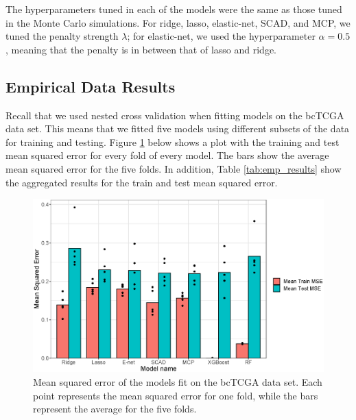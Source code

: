 \documentclass{article}
\begin{document}
	The hyperparameters tuned in each of the models were the same as those tuned in the Monte Carlo simulations. For ridge, lasso, elastic-net, SCAD, and MCP, we tuned the penalty strength $\lambda$; for elastic-net, we used the hyperparameter $\alpha = 0.5$, meaning that the penalty is in between that of lasso and ridge. 
	
	\subsection{Empirical Data Results}
	Recall that we used nested cross validation when fitting models on the bcTCGA data set. This means that we fitted five models using different subsets of the data for training and testing. Figure \ref{fig:empirical_mse} below shows a plot with the training and test mean squared error for every fold of every model. The bars show the average mean squared error for the five folds. In addition, Table \ref{tab:emp_results} show the aggregated results for the train and test mean squared error.
	
	\begin{figure}[h!]
		\centering
		\includegraphics[width = 0.8\linewidth]{images/empirical_mse.eps}
		\captionsetup{width = 0.8\textwidth}
		\caption{Mean squared error of the models fit on the bcTCGA data set. Each point represents the mean squared error for one fold, while the bars represent the average for the five folds.}
		\label{fig:empirical_mse}
	\end{figure}
	
\end{document}
